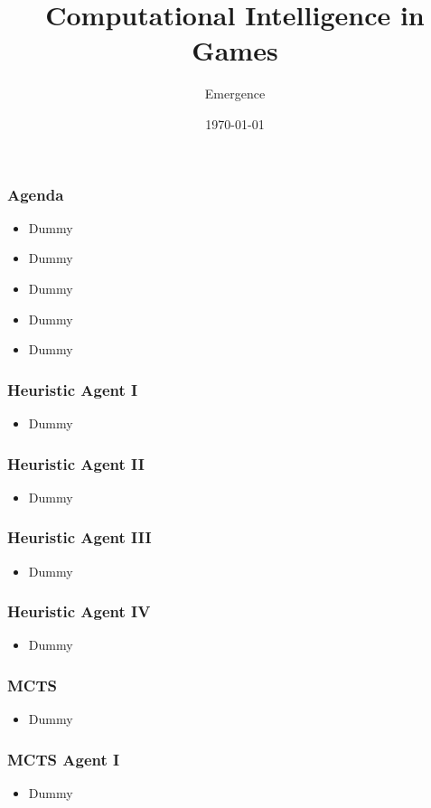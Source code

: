 \documentclass{beamer}
\title{Computational Intelligence in Games}
\author{Emergence}
\date{\today}
\institute{Otto-von-Guericke-University Magdeburg}
\begin{document}
\begin{frame}[plain]
 \titlepage
\end{frame}

\begin{frame}
\frametitle{Agenda}
\begin{itemize}
\item Dummy
\item Dummy
\item Dummy
\item Dummy
\item Dummy
\end{itemize}
\end{frame}


\begin{frame}
\frametitle{Heuristic Agent I}
\begin{itemize}
\item Dummy
\end{itemize}
\end{frame}

\begin{frame}
\frametitle{Heuristic Agent II}
\begin{itemize} \item Dummy
\end{itemize}
\end{frame}


\begin{frame}
\frametitle{Heuristic Agent III}
\begin{itemize}
 \item Dummy
\end{itemize}
\end{frame}

\begin{frame}
\frametitle{Heuristic Agent IV}
\begin{itemize}
 \item Dummy
\end{itemize}
\end{frame}



\begin{frame}
\frametitle{MCTS}
\begin{itemize}
 \item Dummy
\end{itemize}
\end{frame}

\begin{frame}
\frametitle{MCTS Agent I}
\begin{itemize}
 \item Dummy
\end{itemize}
\end{frame}
\end{document}

